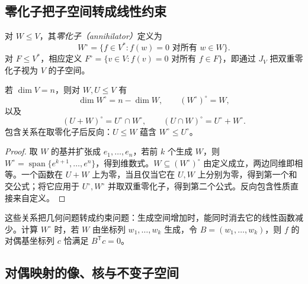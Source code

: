 \subsection{零化子把子空间转成线性约束}

\begin{definition}
\label{def:laex-annihilator}
对 $W\le V$，其\emph{零化子（annihilator）}定义为
\[
 W^\circ=\{f\in V^*:f(w)=0\text{ 对所有 }w\in W\}.
\]
对 $F\le V^*$，相应定义 $F^\circ=\{v\in V:f(v)=0\text{ 对所有 }f\in F\}$，即通过 $J_V$ 把双重零化子视为 $V$ 的子空间。
\end{definition}

\begin{theorem}
\label{thm:laex-annihilator}
若 $\dim V=n$，则对 $W,U\le V$ 有
\begin{equation}
 \dim W^\circ=n-\dim W,\qquad (W^\circ)^\circ=W,
 \label{eq:laex-annihilator-dim}
\end{equation}
以及
\begin{equation}
 (U+W)^\circ=U^\circ\cap W^\circ,\qquad
 (U\cap W)^\circ=U^\circ+W^\circ.
 \label{eq:laex-annihilator-sum-intersection}
\end{equation}
包含关系在取零化子后反向：$U\le W$ 蕴含 $W^\circ\le U^\circ$。
\end{theorem}
\begin{proof}
取 $W$ 的基并扩张成 $e_1,\ldots,e_n$，若前 $k$ 个生成 $W$，则 $W^\circ=\operatorname{span}\{e^{k+1},\ldots,e^n\}$，得到维数式。$W\subseteq(W^\circ)^\circ$ 由定义成立，两边同维即相等。一个函数在 $U+W$ 上为零，当且仅当它在 $U,W$ 上分别为零，得到第一个和交公式；将它应用于 $U^\circ,W^\circ$ 并取双重零化子，得到第二个公式。反向包含性质直接来自定义。
\end{proof}

这些关系把几何问题转成约束问题：生成空间增加时，能同时消去它的线性函数减少。计算 $W^\circ$ 时，若 $W$ 由坐标列 $w_1,\ldots,w_k$ 生成，令 $B=(w_1,\ldots,w_k)$，则 $f$ 的对偶基坐标列 $c$ 恰满足 $B^{\mathsf T}c=0$。

\subsection{对偶映射的像、核与不变子空间}


